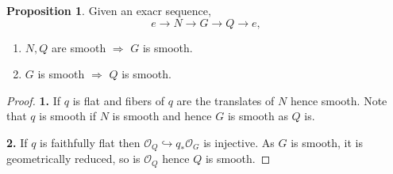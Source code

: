 \documentclass[10pt]{article}
\numberwithin{equation}{section}
\theoremstyle{definition}
\newtheorem{proposition}{Proposition}[section]
\newcommand{\cO}[0]{\mathcal{O}}
\begin{document}
\begin{proposition}
    \label{proposition_24}
    Given an exacr sequence,
    \begin{equation*}
        e\to N\to G\to Q\to e,
    \end{equation*}
    \begin{enumerate}
        \item  $N,Q$ are smooth $\Rightarrow$ $G$ is smooth.
        \item $G$ is smooth $\Rightarrow$ $Q$ is smooth.
    \end{enumerate}
\end{proposition}


\begin{proof}
    \par\textbf{1.} If $q$ is flat and fibers of $q$ are the translates of $N$ hence smooth. Note that $q$ is smooth if $N$ is smooth and hence $G$ is smooth as $Q$ is.
    \par\textbf{2.} If $q$ is faithfully flat then $\cO_Q\hookrightarrow q_*\cO_G$ is injective. As $G$ is smooth, it is geometrically reduced, so is $\cO_Q$ hence $Q$ is smooth.
\end{proof}
\end{document}

